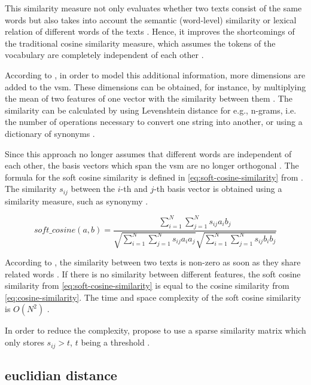 This similarity measure not only evaluates whether two texts consist of the same words but 
also takes into account the semantic (word-level) similarity or lexical relation of different words of the texts \cite{soft_cosine2017}.
Hence, it improves the shortcomings of the traditional cosine similarity measure, 
which assumes the tokens of the vocabulary are completely independent of each other \cite{soft_cosine2014}.

According to \citeauthor{soft_cosine2014}, in order to model this additional information, more dimensions are added to the \ac{vsm}.
These dimensions can be obtained, for instance, by multiplying the mean of two features of one vector with the similarity between them \cite{soft_cosine2014}.
The similarity can be calculated by using Levenshtein distance for e.g., n-grams, i.e. the number of operations necessary to convert one string into another, 
or using a dictionary of synonyms \cite{soft_cosine2014}.

Since this approach no longer assumes that different words are independent of each other, 
the basis vectors which span the \ac{vsm} are no longer orthogonal \cite{soft_cosine2014}.
The formula for the soft cosine similarity is defined in \autoref{eq:soft-cosine-similarity} from \cite{soft_cosine2014}.
The similarity $s_{ij}$ between the $i$-th and $j$-th basis vector is obtained using a similarity measure, such as synonymy \cite{soft_cosine2014}.

\begin{equation}
    soft\_cosine(a,b) = \frac{\sum_{i=1}^{N}\sum_{j=1}^{N}s_{ij}a_{i}b_{j}}{\sqrt{\sum_{i=1}^{N}\sum_{j=1}^{N}s_{ij}a_{i}a_{j}}\sqrt{\sum_{i=1}^{N}\sum_{j=1}^{N}s_{ij}b_{i}b_{j}}}
    \label{eq:soft-cosine-similarity}
\end{equation}

According to \citeauthor{soft_cosine2017}, the similarity between two texts is non-zero as soon as they share related words \cite{soft_cosine2017}.
If there is no similarity between different features, 
the soft cosine similarity from \autoref{eq:soft-cosine-similarity} is equal to the cosine similarity from \autoref{eq:cosine-similarity}.
The time and space complexity of the soft cosine similarity is $O(N^2)$ \cite{soft_cosine2014}.

In order to reduce the complexity, \citeauthor{soft_cosine2014} propose to use a sparse similarity matrix which only stores $s_{ij} > t$, 
$t$ being a threshold \cite{soft_cosine2014}.

\subsection{euclidian distance}\label{subsec:euclidian-distance}

